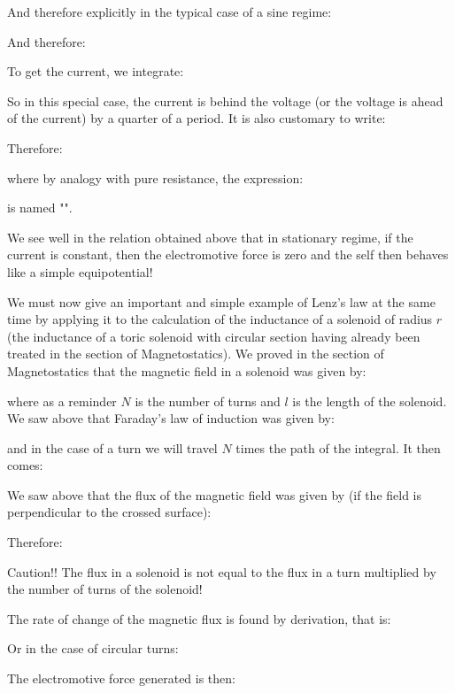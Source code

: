	And therefore explicitly in the typical case of a sine regime:
	
	And therefore:
	
	To get the current, we integrate:
	
	So in this special case, the current is behind the voltage (or the voltage is ahead of the current) by a quarter of a period. It is also customary to write:
	
	Therefore:
	
	where by analogy with pure resistance, the expression:
	
	is named "".
	
	\begin{tcolorbox}[title=Remark,colframe=black,arc=10pt]
	We see well in the relation obtained above that in stationary regime, if the current is constant, then the electromotive force is zero and the self then behaves like a simple equipotential!
	\end{tcolorbox}
	
	We must now give an important and simple example of Lenz's law at the same time by applying it to the calculation of the inductance of a solenoid of radius $r$ (the inductance of a toric solenoid with circular section having already been treated in the section of Magnetostatics). We proved in the section of Magnetostatics that the magnetic field in a solenoid was given by:
	
	where as a reminder $N$ is the number of turns and $l$ is the length of the solenoid. We saw above that Faraday's law of induction was given by:
	
	and in the case of a turn we will travel $N$ times the path of the integral. It then comes:
	
	We saw above that the flux of the magnetic field was given by (if the field is perpendicular to the crossed surface):
	
	Therefore:
	
	\begin{tcolorbox}[title=Remark,colframe=black,arc=10pt]
	Caution!! The flux in a solenoid is not equal to the flux in a turn multiplied by the number of turns of the solenoid!
	\end{tcolorbox}
	The rate of change of the magnetic flux is found by derivation, that is:
	
	Or in the case of circular turns:
	
	The electromotive force generated is then:
	

